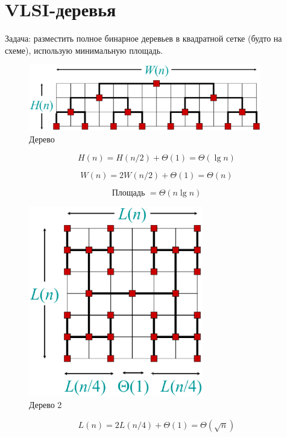 \documentclass[a4paper,11pt]{article}
\begin{document}
\section{VLSI-деревья}

Задача: разместить полное бинарное деревьев в квадратной сетке (будто на схеме),
использую минимальную площадь.

\begin{figure}[ht]
  \centering
  \includegraphics[width=4in]{lecture3/tree1.eps}
  \caption{Дерево}
  \label{fig:tree1}
\end{figure}

\begin{equation*}
  H(n) = H(n/2) + \Theta(1) = \Theta(\lg n)
\end{equation*}

\begin{equation*}
  W(n) = 2W(n/2) + \Theta(1) = \Theta(n)
\end{equation*}

\begin{equation*}
  \text{Площадь }= \Theta(n \lg n)
\end{equation*}

\begin{figure}[ht]
  \centering
  \includegraphics[width=3in]{lecture3/tree2.eps}
  \caption{Дерево 2}
  \label{fig:tree2}
\end{figure}

\begin{equation*}
  L(n) = 2L(n/4) + \Theta(1) = \Theta(\sqrt n)
\end{equation*}
\end{document}
